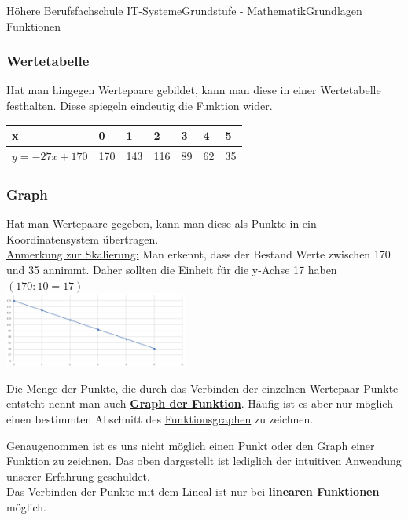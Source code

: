 \documentclass[11pt,twocolumn,oneside,openany,headings=optiontotoc,11pt,numbers=noenddot]{article}
\begin{document}
\begin{worksheet}{Höhere Berufsfachschule IT-Systeme}{Grundstufe - Mathematik}{Grundlagen Funktionen}
		\subsubsection*{Wertetabelle}
		Hat man hingegen Wertepaare gebildet, kann man diese in einer Wertetabelle festhalten. Diese spiegeln eindeutig die Funktion wider.\\
		\par\bigskip\noindent
		\begin{tabularx}{0.5\textwidth}{|X|l|l|l|l|l|l|}
			\hline
			x & 0 & 1 & 2 & 3 & 4 & 5\\
			\hline
			\(y = -27x + 170\) & 170 & 143 & 116 & 89 & 62 & 35\\
			\hline
		\end{tabularx}
		\subsubsection*{Graph}
		Hat man Wertepaare gegeben, kann man diese als Punkte in ein Koordinatensystem übertragen.\\
		\underline{Anmerkung zur Skalierung:} Man erkennt, dass der Bestand Werte zwischen 170 und 35 annimmt. Daher sollten die Einheit für die y-Achse 17 haben \((170:10 = 17)\)\\
		\includegraphics[width=0.45\textwidth]{../99_Bilder/bierkoord.jpg}\\
		\par\bigskip\noindent
		Die Menge der Punkte, die durch das Verbinden der einzelnen Wertepaar-Punkte entsteht nennt man auch \underline{\textbf{Graph der Funktion}}. Häufig ist es aber nur möglich einen bestimmten Abschnitt des \underline{Funktionsgraphen} zu zeichnen.\\
		\par\bigskip\noindent
		Genaugenommen ist es uns nicht möglich einen Punkt oder den Graph einer Funktion zu zeichnen. Das oben dargestellt ist lediglich der intuitiven Anwendung unserer Erfahrung geschuldet.\\
		Das Verbinden der Punkte mit dem Lineal ist nur bei \textbf{linearen Funktionen} möglich.\\
		\textit{\color{red}{Im Allgemeinen gilt: Das Verwenden des Lineals zum Verbinden der Punkte ist streng verboten!}}\\

\end{worksheet}
\end{document}
